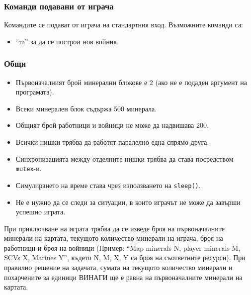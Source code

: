 \documentclass[a4paper,10pt]{article}
\begin{document}
			\subsubsection{Команди подавани от играча}
			Командите се подават от играча на стандартния вход. Възможните команди са:
			\begin{itemize}
				\item ``m'' за да се построи нов войник.
			\end{itemize}
			
			\subsubsection{Общи}
			\begin{itemize}
				\item Първоначалният брой минерални блокове е 2 (ако не е подаден аргумент на програмата).
				\item Всеки минерален блок съдържа 500 минерала.
				\item Общият брой работници и войници не може да надвишава 200.
				\item Всички нишки трябва да работят паралелно една спрямо друга.
				\item Синхронизацията между отделните нишки трябва да става посредством \verb|mutex|-и.
				\item Симулирането на време става чрез използването на \verb|sleep()|.
				\item Не е нужно да се следи за ситуации, в които играчът не може да завърши успешно играта.
			\end{itemize}
			
			При приключване на играта трябва да се изведе броя на първоначалните минерали на картата, текущото количество минерали на играча, броя на работници и броя на войници (Пример: ``Map minerals N, player minerals M, SCVs X, Marines Y'', където N, M, X, Y са броя на съответните ресурси). При правилно решение на задачата, сумата на текущото количество минерали и похарчените за единици ВИНАГИ ще е равна на първоначалните минерали на картата.
			
\end{document}
